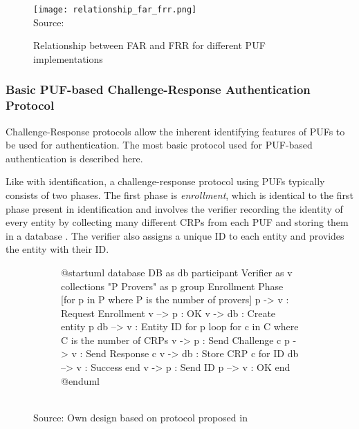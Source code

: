 \begin{figure}[H]
    \centering
    \caption{Relationship between FAR and FRR for different PUF implementations}
    \label{fig:relationship_far_frr}
    \texttt{[image: relationship\_far\_frr.png]}
    \\
    Source: \cite[][p. 125]{Maes2013}
\end{figure}

\subsubsection{Basic PUF-based Challenge-Response Authentication Protocol}
\label{sec:basic_challenge_response_protocol}

Challenge-Response protocols allow the inherent identifying features of PUFs to be used for authentication.
The most basic protocol used for PUF-based authentication is described here.

Like with identification, a challenge-response protocol using PUFs typically consists of two phases.
The first phase is \emph{enrollment}, which is identical to the first phase present in identification and
involves the verifier recording the identity of every entity by collecting many different \acp{CRP} from each
PUF and storing them in a database \cite[][p. 129f]{Maes2013}.
The verifier also assigns a unique ID to each entity and provides the entity with their ID.

\begin{figure}[h]
    \centering
    \captionsetup{justification=centering}
    \caption{UML Sequence Diagram showing the Enrollment Phase in the Basic Protocol}
    \label{fig:seq_dia_basic_protocol_enrollment}
    \begin{subfigure}{0.8\textwidth}
        \begin{plantuml}
            @startuml
            database DB as db
            participant Verifier as v
            collections "P Provers" as p
            group Enrollment Phase [for p in P where P is the number of provers]
            p -> v : Request Enrollment
            v --> p : OK
            v -> db : Create entity p
            db --> v : Entity ID for p
            loop for c in C where C is the number of CRPs
            v -> p : Send Challenge c
            p -> v : Send Response c
            v -> db : Store CRP c for ID
            db --> v : Success
            end
            v -> p : Send ID
            p --> v : OK
            end
            @enduml
        \end{plantuml}
    \end{subfigure}
    \\
    Source: Own design based on protocol proposed in \cite[][p. 129f]{Maes2013}
\end{figure}

